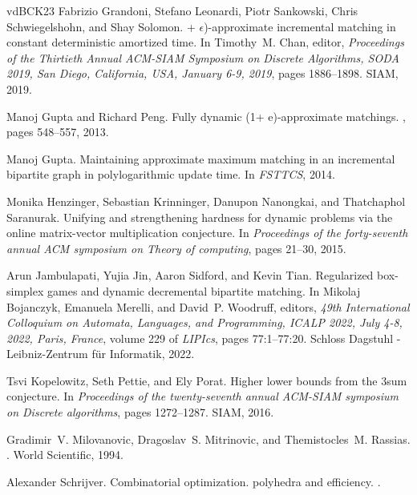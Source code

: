 \documentclass[a4paper,11pt]{article}
\theoremstyle{definition}
\theoremstyle{definition}
\theoremstyle{definition}
\theoremstyle{definition}
\theoremstyle{definition}
\theoremstyle{definition}
\theoremstyle{definition}
\theoremstyle{definition}
\theoremstyle{definition}
\theoremstyle{definition}
\theoremstyle{definition}
\theoremstyle{definition}
\theoremstyle{definition}
\theoremstyle{definition}
\theoremstyle{definition}
\begin{document}
\begin{thebibliography}{vdBCK{\etalchar{+}}23}
Fabrizio Grandoni, Stefano Leonardi, Piotr Sankowski, Chris Schwiegelshohn, and
  Shay Solomon.
 + {\(\epsilon\)})-approximate incremental matching in constant
  deterministic amortized time.
\newblock In Timothy~M. Chan, editor, {\em Proceedings of the Thirtieth Annual
  {ACM-SIAM} Symposium on Discrete Algorithms, {SODA} 2019, San Diego,
  California, USA, January 6-9, 2019}, pages 1886--1898. {SIAM}, 2019.

Manoj Gupta and Richard Peng.
\newblock Fully dynamic (1+ e)-approximate matchings.
, pages 548--557, 2013.

Manoj Gupta.
\newblock Maintaining approximate maximum matching in an incremental bipartite
  graph in polylogarithmic update time.
\newblock In {\em FSTTCS}, 2014.

Monika Henzinger, Sebastian Krinninger, Danupon Nanongkai, and Thatchaphol
  Saranurak.
\newblock Unifying and strengthening hardness for dynamic problems via the
  online matrix-vector multiplication conjecture.
\newblock In {\em Proceedings of the forty-seventh annual ACM symposium on
  Theory of computing}, pages 21--30, 2015.

Arun Jambulapati, Yujia Jin, Aaron Sidford, and Kevin Tian.
\newblock Regularized box-simplex games and dynamic decremental bipartite
  matching.
\newblock In Mikolaj Bojanczyk, Emanuela Merelli, and David~P. Woodruff,
  editors, {\em 49th International Colloquium on Automata, Languages, and
  Programming, {ICALP} 2022, July 4-8, 2022, Paris, France}, volume 229 of {\em
  LIPIcs}, pages 77:1--77:20. Schloss Dagstuhl - Leibniz-Zentrum f{\"{u}}r
  Informatik, 2022.

Tsvi Kopelowitz, Seth Pettie, and Ely Porat.
\newblock Higher lower bounds from the 3sum conjecture.
\newblock In {\em Proceedings of the twenty-seventh annual ACM-SIAM symposium
  on Discrete algorithms}, pages 1272--1287. SIAM, 2016.

Gradimir~V. Milovanovic, Dragoslav~S. Mitrinovic, and Themistocles~M. Rassias.
.
\newblock World Scientific, 1994.

Alexander Schrijver.
\newblock Combinatorial optimization. polyhedra and efficiency.
.


\end{thebibliography}
\end{document}
